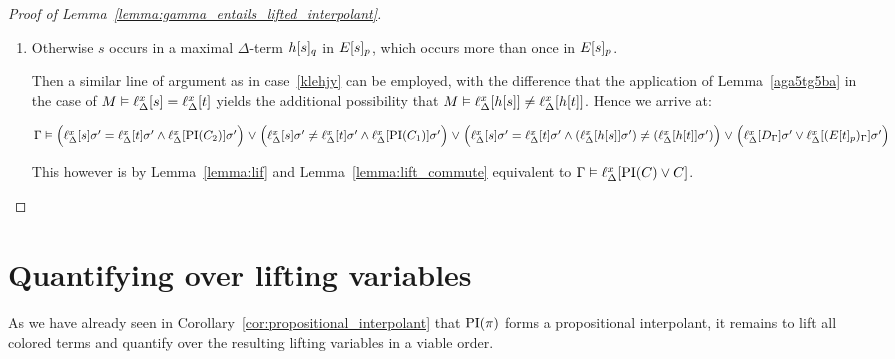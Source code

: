 \begin{proof}[Proof of Lemma~\ref{lemma:gamma_entails_lifted_interpolant}]
\begin{description}
\begin{enumerate}
				\item Otherwise $s$ occurs in a maximal $\Delta$-term $h{[s]_{q}}$ in $E{[s]_{p}}$, which occurs more than once in $E{[s]_{p}}$.

					Then a similar line of argument as in case~\ref{klehjy} can be employed, with the difference that the application of Lemma~\ref{aga5tg5ba} in the case of $M\vDash \ell_{\Delta}^{x}[s] = \ell_{\Delta}^{x}[t]$ yields the additional possibility that 
					$M\vDash \ell_{\Delta}^{x}[h[s]] \neq \ell_{\Delta}^{x}[h[t]]$.
					Hence we arrive at:

					$\Gamma \vDash
					\Big(\ell_{\Delta}^{x}[s]\sigma'=\ell_{\Delta}^{x}[t]\sigma' \land \ell_{\Delta}^{x}[\operatorname{PI}(C_2)]\sigma'\Big) \;{\lor}\;\allowbreak
					\Big(\ell_{\Delta}^{x}[s]\sigma'\neq\ell_{\Delta}^{x}[t]\sigma' \land \ell_{\Delta}^{x}[\operatorname{PI}(C_1)]\sigma'\Big) \;{\lor}\;\allowbreak
					\Big(\ell_{\Delta}^{x}[s]\sigma'=\ell_{\Delta}^{x}[t]\sigma' \land (\ell_{\Delta}^{x}[h[s]]\sigma') \neq (\ell_{\Delta}^{x}[h[t]]\sigma' )\Big) \;{\lor}\;\allowbreak
					\Big(\ell_{\Delta}^{x}[D_\Gamma]\sigma' \lor \ell_{\Delta}^{x}[(E{[t]_{p}})_\Gamma]\sigma'\Big)$

					This however is by Lemma~\ref{lemma:lif} and Lemma~\ref{lemma:lift_commute} equivalent to $\Gamma \entails \lifdelta{\PI(C) \lor\nolinebreak C}$.
					\qedhere
			\end{enumerate}
	\end{description}
\end{proof}



\section{Quantifying over lifting variables}

As we have already seen in Corollary~\ref{cor:propositional_interpolant} that $\operatorname{PI}(\pi)$ forms a propositional interpolant, it remains to lift all colored terms and quantify over the resulting lifting variables in a viable order.


